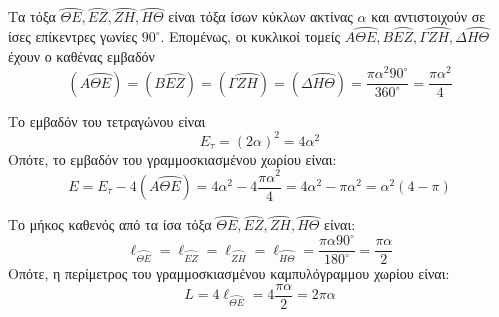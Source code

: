 \begin{alist}
    \item Τα τόξα $\wideparen{ΘΕ}, \wideparen{ΕΖ}, \wideparen{ΖΗ}, \wideparen{ΗΘ}$ είναι τόξα ίσων κύκλων ακτίνας $\alpha$ και αντιστοιχούν σε ίσες επίκεντρες γωνίες $90^\circ$. Επομένως, οι κυκλικοί τομείς $Α\wideparen{ΘΕ}, Β\wideparen{ΕΖ}, Γ\wideparen{ΖΗ}, Δ\wideparen{ΗΘ}$ έχουν ο καθένας εμβαδόν
    \[ (Α\wideparen{ΘΕ}) = (Β\wideparen{ΕΖ}) = (Γ\wideparen{ΖΗ}) = (Δ\wideparen{ΗΘ}) = \frac{\pi\alpha^2 90^\circ}{360^\circ} = \frac{\pi\alpha^2}{4} \]
    
    \item Το εμβαδόν του τετραγώνου είναι
    \[ E_\tau = (2\alpha)^2 = 4\alpha^2 \]
    Οπότε, το εμβαδόν του γραμμοσκιασμένου χωρίου είναι:
    \[ E = E_\tau - 4(Α\wideparen{ΘΕ}) = 4\alpha^2 - 4\frac{\pi\alpha^2}{4} = 4\alpha^2 - \pi\alpha^2 = \alpha^2(4 - \pi) \]
    
    \item Το μήκος καθενός από τα ίσα τόξα $\wideparen{ΘΕ}, \wideparen{ΕΖ}, \wideparen{ΖΗ}, \wideparen{ΗΘ}$ είναι:
    \[ \ell_{\wideparen{ΘΕ}} = \ell_{\wideparen{ΕΖ}} = \ell_{\wideparen{ΖΗ}} = \ell_{\wideparen{ΗΘ}} = \frac{\pi\alpha 90^\circ}{180^\circ} = \frac{\pi\alpha}{2} \]
    Οπότε, η περίμετρος του γραμμοσκιασμένου καμπυλόγραμμου χωρίου είναι:
    \[ L = 4\ell_{\wideparen{ΘΕ}} = 4\frac{\pi\alpha}{2} = 2\pi\alpha \]
\end{alist}